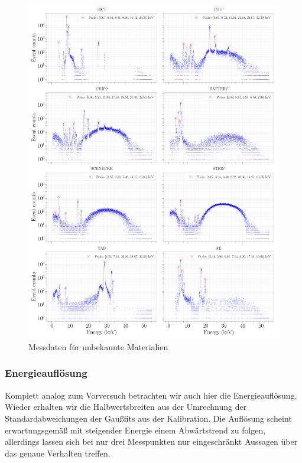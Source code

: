 \documentclass[a4paper,14pt]{article}
\begin{document}
\begin{figure}[H]
\centering
\includegraphics[scale=0.2]{../Figures/XRay-analysis.pdf}
\caption{Messdaten für unbekannte Materialien}
\label{XRay_analysis}
\end{figure}

\subsubsection{Energieauflösung}
Komplett analog zum Vorversuch betrachten wir auch hier die Energieauflösung. Wieder erhalten wir die Halbwertsbreiten aus der Umrechnung der Standardabweichungen der Gaußfits aus der Kalibration. Die Auflösung scheint erwartungsgemäß mit steigender Energie einem Abwärtstrend zu folgen, allerdings lassen sich bei nur drei Messpunkten nur eingeschränkt Aussagen über das genaue Verhalten treffen.
\end{document}
